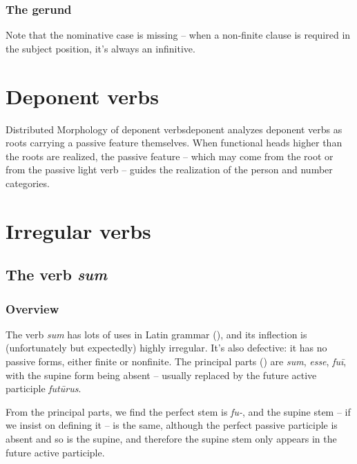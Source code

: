 \documentclass[a4paper, oneside]{report}
\newcommand{\form}[1]{\emph{#1}}
\begin{document}
\subsubsection{The gerund}\label{sec:gerund-morphology}

Note that the nominative case is missing -- 
when a non-finite clause is required in the subject position,
it's always an infinitive.

\section{Deponent verbs}\label{sec:deponent-verbs}

\begin{theorybox}{Distributed Morphology of deponent verbs}{deponent}
    \citet{embick2000features} analyzes deponent verbs as roots carrying a passive feature themselves.
    When functional heads higher than the roots are realized,
    the passive feature -- which may come from the root or from the passive light verb -- 
    guides the realization of the person and number categories.
\end{theorybox}



\section{Irregular verbs}\label{sec:irregular-verbs}

\subsection{The verb \form{sum}}\label{sec:sum-morphology}

\subsubsection{Overview}

The verb \form{sum} has lots of uses in Latin grammar (),
and its inflection is (unfortunately but expectedly) highly irregular.
It's also defective: 
it has no passive forms, either finite or nonfinite.
The principal parts () are 
\form{sum}, \form{esse}, \form{fuī}, 
with the supine form being absent -- usually replaced by the future active participle \form{futūrus}.

From the principal parts, 
we find the perfect stem is \form{fu-}, 
and the supine stem -- if we insist on defining it -- 
is the same, 
although the perfect passive participle is absent and so is the supine,
and therefore the supine stem only appears in the future active participle.
\end{document}
